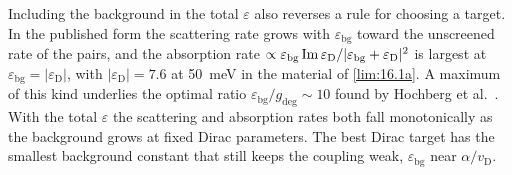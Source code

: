 Including the background in the total $\varepsilon$ also reverses a rule for choosing a target. In the published form the scattering rate grows with $\varepsilon_{\mathrm{bg}}$ toward the unscreened rate of the pairs, and the absorption rate $\propto \varepsilon_{\mathrm{bg}}\operatorname{Im}\varepsilon_{\mathrm{D}}/|\varepsilon_{\mathrm{bg}} + \varepsilon_{\mathrm{D}}|^2$ is largest at $\varepsilon_{\mathrm{bg}} = |\varepsilon_{\mathrm{D}}|$, with $|\varepsilon_{\mathrm{D}}| = 7.6$ at \SI{50}{meV} in the material of \cref{lim:16.1a}. A maximum of this kind underlies the optimal ratio $\varepsilon_{\mathrm{bg}}/g_{\mathrm{deg}} \sim 10$ found by Hochberg et al.~\cite[Sect.~4.2]{hochberg2018detection}. With the total $\varepsilon$ the scattering and absorption rates both fall monotonically as the background grows at fixed Dirac parameters. The best Dirac target has the smallest background constant that still keeps the coupling weak, $\varepsilon_{\mathrm{bg}}$ near $\alpha/v_{\mathrm{D}}$.

